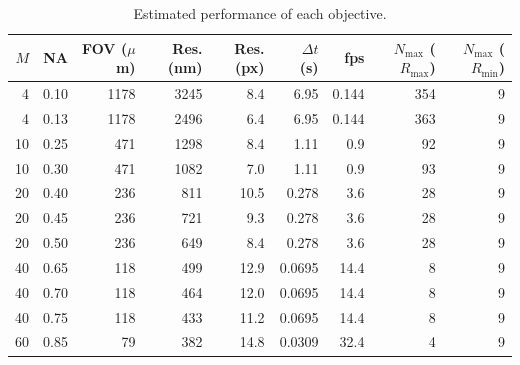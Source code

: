 \begin{table}[ht]
\centering
\small
\caption{Estimated performance of each objective.}
\label{tab:objectives}
\begin{tabular}{rrrrrrrrr}
\toprule
$M$ & NA & FOV ($\mu$m) & Res. (nm) & Res. (px) & $\Delta t$ (s) & fps & $N_{\max}$ ($R_{\max}$) & $N_{\max}$ ($R_{\min}$) \\
\midrule
4 & 0.10 & 1178 & 3245 & 8.4 & 6.95 & 0.144 & 354 & 9 \\
4 & 0.13 & 1178 & 2496 & 6.4 & 6.95 & 0.144 & 363 & 9 \\
10 & 0.25 & 471 & 1298 & 8.4 & 1.11 & 0.9 & 92 & 9 \\
10 & 0.30 & 471 & 1082 & 7.0 & 1.11 & 0.9 & 93 & 9 \\
20 & 0.40 & 236 & 811 & 10.5 & 0.278 & 3.6 & 28 & 9 \\
20 & 0.45 & 236 & 721 & 9.3 & 0.278 & 3.6 & 28 & 9 \\
20 & 0.50 & 236 & 649 & 8.4 & 0.278 & 3.6 & 28 & 9 \\
40 & 0.65 & 118 & 499 & 12.9 & 0.0695 & 14.4 & 8 & 9 \\
40 & 0.70 & 118 & 464 & 12.0 & 0.0695 & 14.4 & 8 & 9 \\
40 & 0.75 & 118 & 433 & 11.2 & 0.0695 & 14.4 & 8 & 9 \\
60 & 0.85 & 79 & 382 & 14.8 & 0.0309 & 32.4 & 4 & 9 \\
\bottomrule
\end{tabular}
\end{table}
